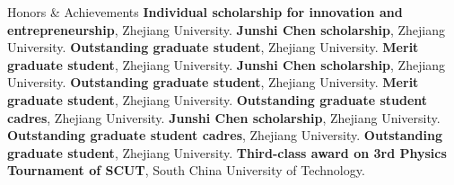 \begin{rubric}{Honors \& Achievements}
\entry*[2022] \textbf{Individual scholarship for innovation and entrepreneurship}, Zhejiang University.
\entry*[2022] \textbf{Junshi Chen scholarship}, Zhejiang University.
\entry*[2022] \textbf{Outstanding graduate student}, Zhejiang University.
\entry*[2022] \textbf{Merit graduate student}, Zhejiang University.
\entry*[2021] \textbf{Junshi Chen scholarship}, Zhejiang University.
\entry*[2021] \textbf{Outstanding graduate student}, Zhejiang University.
\entry*[2021] \textbf{Merit graduate student}, Zhejiang University.
\entry*[2021] \textbf{Outstanding graduate student cadres}, Zhejiang University.
\entry*[2020] \textbf{Junshi Chen scholarship}, Zhejiang University.
\entry*[2020] \textbf{Outstanding graduate student cadres}, Zhejiang University.
\entry*[2019] \textbf{Outstanding graduate student}, Zhejiang University.
\entry*[2015] \textbf{Third-class award on 3rd Physics Tournament of SCUT}, South China University of Technology.
\end{rubric}